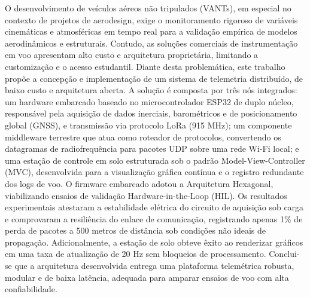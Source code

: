 O desenvolvimento de veículos aéreos não tripulados (VANTs), em especial no contexto de projetos de aerodesign, exige o monitoramento rigoroso de variáveis cinemáticas e atmosféricas em tempo real para a validação empírica de modelos aerodinâmicos e estruturais. Contudo, as soluções comerciais de instrumentação em voo apresentam alto custo e arquitetura proprietária, limitando a customização e o acesso estudantil. Diante desta problemática, este trabalho propõe a concepção e implementação de um sistema de telemetria distribuído, de baixo custo e arquitetura aberta. A solução é composta por três nós integrados: um hardware embarcado baseado no microcontrolador ESP32 de duplo núcleo, responsável pela aquisição de dados inerciais, barométricos e de posicionamento global (GNSS), e transmissão via protocolo LoRa (915 MHz); um componente middleware terrestre que atua como roteador de protocolos, convertendo os datagramas de radiofrequência para pacotes UDP sobre uma rede Wi-Fi local; e uma estação de controle em solo estruturada sob o padrão Model-View-Controller (MVC), desenvolvida para a visualização gráfica contínua e o registro redundante dos logs de voo. O firmware embarcado adotou a Arquitetura Hexagonal, viabilizando ensaios de validação Hardware-in-the-Loop (HIL). Os resultados experimentais atestaram a estabilidade elétrica do circuito de aquisição sob carga e comprovaram a resiliência do enlace de comunicação, registrando apenas 1\% de perda de pacotes a 500 metros de distância sob condições não ideais de propagação. Adicionalmente, a estação de solo obteve êxito ao renderizar gráficos em uma taxa de atualização de 20 Hz sem bloqueios de processamento. Conclui-se que a arquitetura desenvolvida entrega uma plataforma telemétrica robusta, modular e de baixa latência, adequada para amparar ensaios de voo com alta confiabilidade.


